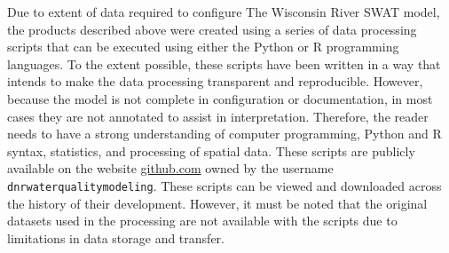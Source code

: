 Due to extent of data required to configure The Wisconsin River SWAT model, the
products described above were created using a series of data processing scripts
that can be executed using either the Python or R programming languages. To the
extent possible, these scripts have been written in a way that intends to make
the data processing transparent and reproducible. However, because the model is
not complete in configuration or documentation, in most cases they are not
annotated to assist in interpretation. Therefore, the reader needs to have a
strong understanding of computer programming, Python and R syntax, statistics,
and processing of spatial data. These scripts are publicly available on the
website \href{http://github.com}{github.com} owned by the username
\texttt{dnrwaterqualitymodeling}. These scripts can be viewed and downloaded
across the history of their development. However, it must be noted that the
original datasets used in the processing are not available with the scripts due
to limitations in data storage and transfer.

\pagebreak